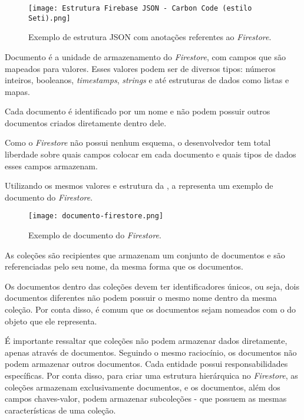 \begin{figure}[!htb]
    \centering
    \texttt{[image: Estrutura Firebase JSON - Carbon Code (estilo Seti).png]}
    \caption{Exemplo de estrutura JSON com anotações referentes ao \textit{Firestore}.}
    \label{fig:exemplofirestorejson}
\end{figure}

Documento é a unidade de armazenamento do \textit{Firestore}, com campos que são mapeados para valores. Esses valores podem ser de diversos tipos: números inteiros, booleanos, \textit{timestamps}, \textit{strings} e até estruturas de dados como listas e mapas.

Cada documento é identificado por um nome e não podem possuir outros documentos criados diretamente dentro dele.

Como o \textit{Firestore} não possui nenhum esquema, o desenvolvedor tem total liberdade sobre quais campos colocar em cada documento e quais tipos de dados esses campos armazenam.

Utilizando os mesmos valores e estrutura da , a  representa um exemplo de documento do \textit{Firestore}.

\begin{figure}[!htb]
    \centering
    \texttt{[image: documento-firestore.png]}
    \caption{Exemplo de documento do \textit{Firestore}.}
    \label{fig:explicacaodocumentofirestore}
\end{figure}

As coleções são recipientes que armazenam um conjunto de documentos e são referenciadas pelo seu nome, da mesma forma que os documentos.

Os documentos dentro das coleções devem ter identificadores únicos, ou seja, dois documentos diferentes não podem possuir o mesmo nome dentro da mesma coleção. Por conta disso, é comum que os documentos sejam nomeados com o  do objeto que ele representa.

É importante ressaltar que coleções não podem armazenar dados diretamente, apenas através de documentos. Seguindo o mesmo raciocínio, os documentos não podem armazenar outros documentos. Cada entidade possui responsabilidades específicas. Por conta disso, para criar uma estrutura hierárquica no \textit{Firestore}, as coleções armazenam exclusivamente documentos, e os documentos, além dos campos chaves-valor, podem armazenar subcoleções - que possuem as mesmas características de uma coleção.

